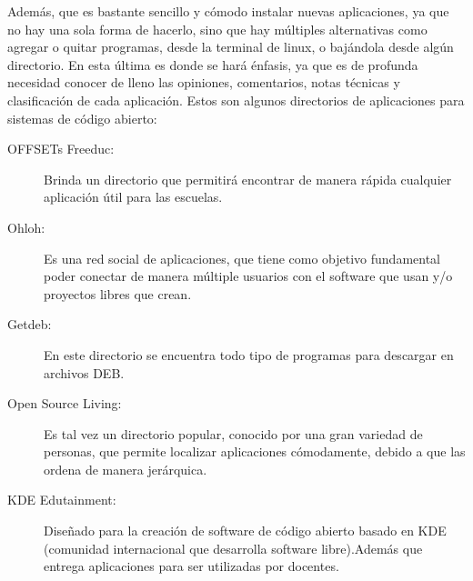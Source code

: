 Además, que es bastante sencillo y cómodo instalar nuevas
aplicaciones, ya que no hay una sola forma de hacerlo, sino que
hay múltiples alternativas como agregar o quitar programas,
desde la terminal de linux, o bajándola desde algún directorio.
En esta última es donde se hará énfasis, ya que es de profunda
necesidad conocer de lleno las opiniones, comentarios, notas
técnicas y clasificación de cada aplicación. Estos son algunos
directorios de aplicaciones para sistemas de código abierto:
\begin{description}
	\item[ OFFSETs Freeduc:] Brinda un directorio que permitirá encontrar
	de manera rápida cualquier aplicación útil para las escuelas.
	\item[ Ohloh:] Es una red social de aplicaciones, que tiene como
	objetivo fundamental poder conectar de manera múltiple
	usuarios con el software que usan y/o proyectos libres que
	crean.
	\item[ Getdeb:] En este directorio se encuentra todo tipo de programas
	para descargar en archivos DEB.
	\item[ Open Source Living:]Es tal vez un directorio popular, conocido
	por una gran variedad de personas, que permite localizar
	aplicaciones cómodamente, debido a que las ordena de manera
	jerárquica.
	\item[ KDE Edutainment:] Diseñado para la creación de software de
	código abierto basado en KDE (comunidad internacional que
	desarrolla software libre).Además que entrega aplicaciones para
	ser utilizadas por docentes.
\end{description}

